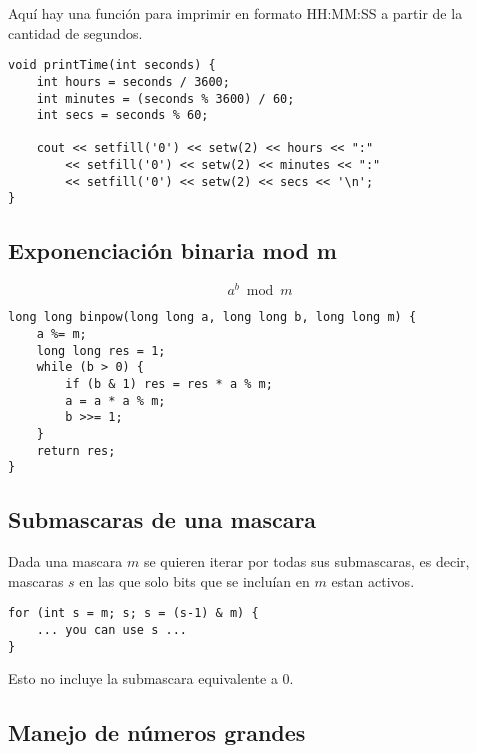 \documentclass[10pt]{article}
\begin{document}
Aquí hay una función para imprimir en formato HH:MM:SS a partir de la cantidad de segundos.

\begin{lstlisting}
void printTime(int seconds) {
    int hours = seconds / 3600;
    int minutes = (seconds % 3600) / 60;
    int secs = seconds % 60;
        
    cout << setfill('0') << setw(2) << hours << ":"
        << setfill('0') << setw(2) << minutes << ":"
        << setfill('0') << setw(2) << secs << '\n';
}
\end{lstlisting}

\subsection{Exponenciación binaria mod m}

\[ a^b \bmod m \]

\begin{lstlisting}
long long binpow(long long a, long long b, long long m) {
    a %= m;
    long long res = 1;
    while (b > 0) {
        if (b & 1) res = res * a % m;
        a = a * a % m;
        b >>= 1;
    }
    return res;
}
\end{lstlisting}

\subsection{Submascaras de una mascara}

Dada una mascara $m$ se quieren iterar por todas sus submascaras, es decir, mascaras $s$ en las que solo bits que se incluían en $m$ estan activos.

\begin{lstlisting}
for (int s = m; s; s = (s-1) & m) {
    ... you can use s ...
}
\end{lstlisting}

Esto no incluye la submascara equivalente a 0.

\subsection{Manejo de números grandes}
\end{document}
